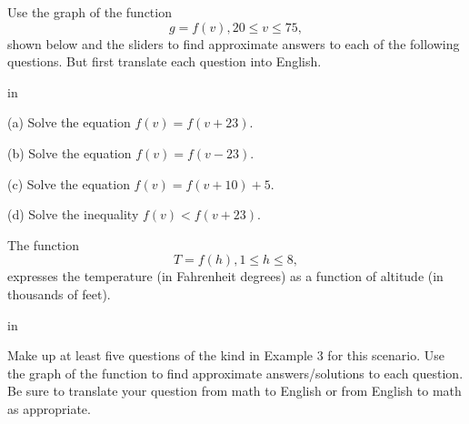 \documentclass{ximera}
\newcommand{\pskip}{\vskip 0.1 in}
\begin{document}
\begin{example} \label{Ex:Fun45}

Use the graph of the function 
\[
    g = f(v) , 20\leq v \leq 75 ,
\]
shown below and the sliders to find approximate answers to each of the following questions. But first translate each question into English.

\pskip

(a) Solve the equation $f(v) = f(v+23)$.

(b) Solve the equation $f(v) = f(v-23)$.

(c) Solve the equation $f(v) = f(v+10) + 5$.

(d) Solve the inequality $f(v) < f(v+23)$.


 
\begin{onlineOnly}
    \begin{center}
\end{center}
\end{onlineOnly}

\end{example}





\begin{example} \label{Ex:Fun55}
The function
\[
   T = f(h) , 1\leq h \leq 8,
\]
expresses the temperature (in Fahrenheit degrees) as a function of altitude (in thousands of feet). 

\pskip

Make up at least five questions of the kind in Example 3 for this scenario. Use the graph of the function to find approximate answers/solutions to each question. Be sure to translate your question from math to English or from English to math as appropriate.

\begin{exploration}\label{exp:Fun5}


 
\begin{onlineOnly}
    \begin{center}
\end{center}
\end{onlineOnly}
\end{exploration}

\end{example}
\end{document}
